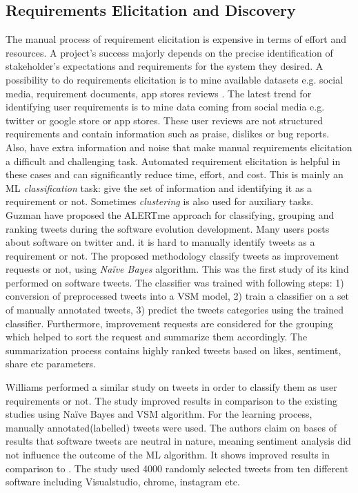 
\subsection{Requirements Elicitation and Discovery}

The manual process of requirement elicitation is expensive in terms of
effort and resources. A project's success majorly depends
on the precise identification of stakeholder's expectations and requirements for
the system they desired.
A possibility to do requirements elicitation is to mine available datasets e.g.
social media, requirement documents, app stores reviews . The latest trend for
identifying user requirements is to mine data coming from social media e.g. twitter or
google store or app stores. These user reviews are not structured requirements
and contain information such as praise, dislikes or bug reports. Also, have extra information and noise that make manual requirements elicitation a difficult and challenging task.
Automated requirement elicitation is helpful in these cases and can
significantly reduce time, effort, and cost. This is mainly an ML
\emph{classification} task: give the set of information and identifying it as a
requirement or not. Sometimes \emph{clustering} is also used for auxiliary
tasks.\\

Guzman \etal \cite{Guzman:2017} have proposed the ALERTme approach for
classifying, grouping and ranking tweets during the software
evolution development. Many users posts about software on twitter and. it is hard to manually identify tweets as a requirement or not. The proposed methodology classify tweets as improvement requests or not, using \emph{Naïve Bayes} algorithm. This was the first study of
its kind performed on software tweets. 
The classifier was trained with following steps: 1) conversion of
preprocessed tweets into a VSM model, 2) train a classifier
on a set of manually annotated tweets, 3) predict the tweets categories using the trained classifier. Furthermore, improvement
requests are considered for the grouping which helped to sort the
request and summarize them accordingly. The summarization process contains highly ranked tweets based on likes, sentiment, share etc parameters.

Williams \etal \cite{Williams:2017} performed a similar study on tweets in order
to classify them as user requirements or not. The study improved results in
comparison to the existing studies using Naïve Bayes and VSM algorithm. For the learning
process, manually annotated(labelled) tweets were used. The authors claim on bases of results that
software tweets are neutral in nature, meaning sentiment analysis did not
influence the outcome of the ML algorithm. It shows improved results in comparison to \cite{Guzman:2017}.
The study used 4000 randomly selected tweets from ten different
software including Visualstudio, chrome, instagram etc.\\

